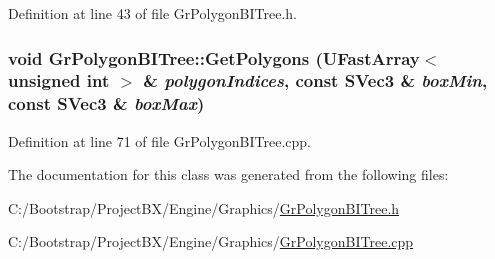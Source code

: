 Definition at line 43 of file GrPolygonBITree.h.\hypertarget{class_gr_polygon_b_i_tree_996913f341c57731dede839590ca4481}{
\subsubsection[{GetPolygons}]{\setlength{\rightskip}{0pt plus 5cm}void GrPolygonBITree::GetPolygons ({\bf UFastArray}$<$ unsigned int $>$ \& {\em polygonIndices}, \/  const {\bf SVec3} \& {\em boxMin}, \/  const {\bf SVec3} \& {\em boxMax})}}
\label{class_gr_polygon_b_i_tree_996913f341c57731dede839590ca4481}




Definition at line 71 of file GrPolygonBITree.cpp.

The documentation for this class was generated from the following files:\begin{CompactItemize}
\item 
C:/Bootstrap/ProjectBX/Engine/Graphics/\hyperlink{_gr_polygon_b_i_tree_8h}{GrPolygonBITree.h}\item 
C:/Bootstrap/ProjectBX/Engine/Graphics/\hyperlink{_gr_polygon_b_i_tree_8cpp}{GrPolygonBITree.cpp}\end{CompactItemize}
